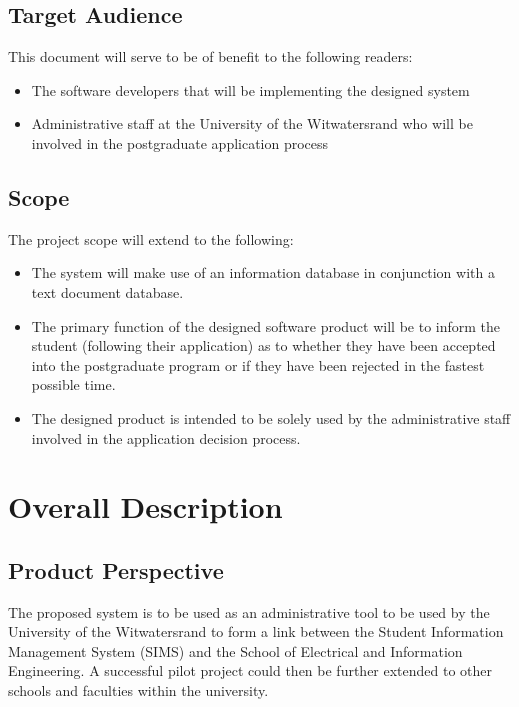 \documentclass[journal,comsoc,onecolumn]{IEEEtran}
\begin{document}
\subsection{Target Audience}
This document will serve to be of benefit to the following readers:

\begin{itemize}
	\item The software developers that will be implementing the designed system
	\item Administrative staff at the University of the Witwatersrand who will be involved in the postgraduate application process 
\end{itemize}
	
\subsection{Scope}	
The project scope will extend to the following:

\begin{itemize}
\item The system will make use of an information database in conjunction with a text document database.
\item The primary function of the designed software product will be to inform the student (following their application) as to whether they have been accepted into the postgraduate program or if they have been rejected in the fastest possible time.
\item The designed product is intended to be solely used by the administrative staff involved in the application decision process.
\end{itemize}

\pagebreak


\section{Overall Description}

\subsection{Product Perspective}
The proposed system is to be used as an administrative tool to be used by the University of the Witwatersrand to form a link between the Student Information Management System (SIMS) and the School of Electrical and Information Engineering. A successful pilot project could then be further extended to other schools and faculties within the university.
\end{document}
